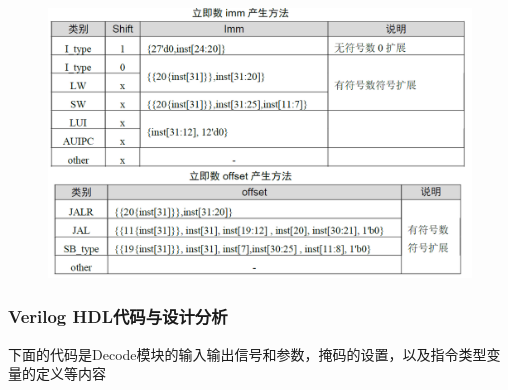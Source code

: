 \documentclass[12pt,hyperref,a4paper,UTF8]{ctexart}
\begin{document}
\begin{enumerate}
    \begin{figure}[H]
        \centering
        \includegraphics[width=1\textwidth]{figures/fig/image4.png}
    \end{figure}
\end{enumerate}

\subsubsection*
{\Large Verilog HDL代码与设计分析}
\normalsize


下面的代码是Decode模块的输入输出信号和参数，掩码的设置，以及指令类型变量的定义等内容
\end{document}
